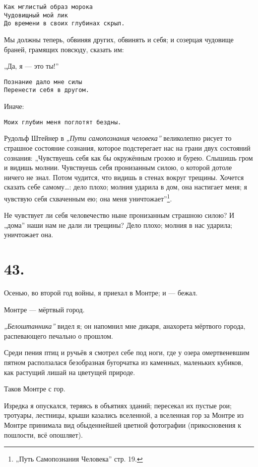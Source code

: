 \documentclass[12pt,a4paper,oneside]{book}
\begin{document}
\begin{Verbatim}
Как мглистый образ морока
Чудовищный мой лик
До времени в своих глубинах скрыл.
\end{Verbatim}

Мы должны теперь, обвиняя других, обвинять и себя; и созерцая чудовище браней, грамящих повсюду, сказать им:

„Да, я — это ты!”

\begin{Verbatim}
Познание дало мне силы
Перенести себя в другом.
\end{Verbatim}

Иначе:

\begin{Verbatim}
Моих глубин меня поглотят бездны.
\end{Verbatim}

Рудольф Штейнер в \emph{„Пути самопознания человека”} великолепно рисует то страшное состояние сознания, которое подстерегает нас на грани двух состояний сознания: „Чувствуешь себя как бы окружённым грозою и бурею. Слышишь гром и видишь молнии. Чувствуешь себя пронизанным силою, о которой дотоле ничего не знал. Потом чудится, что видишь в стенах вокруг трещины. Хочется сказать себе самому…: дело плохо; молния ударила в дом, она настигает меня; я чувствую себя схваченным ею; она меня уничтожает”\footnote{„Путь Самопознания Человека” стр. 19.}.

Не чувствует ли себя человечество ныне пронизанным страшною силою? И „дома” наши нам не дали ли трещины? Дело плохо; молния в нас ударила; уничтожает она.

\section*{43.}

Осенью, во второй год войны, я приехал в Монтре; и — бежал.

Монтре — мёртвый город.

\emph{„Белоштанника”} видел я; он напомнил мне дикаря, анахорета мёртвого города, распевающего печально о прошлом.

Среди пения птиц и ручьёв я смотрел себе под ноги, где у озера омертвеневшим пятном расползалася безобразная бугорчатка из каменных, маленьких кубиков, как растущий лишай на цветущей природе.

Таков Монтре с гор.

Изредка я опускался, теряясь в объятиях зданий; пересекал их пустые рои; тротуары, лестницы, крыши казались вселенной, а вселенная гор за Монтре из Монтре принимала вид обыденнейшей цветной фотографии (прикосновения к пошлости, всё опошляет).
\end{document}

